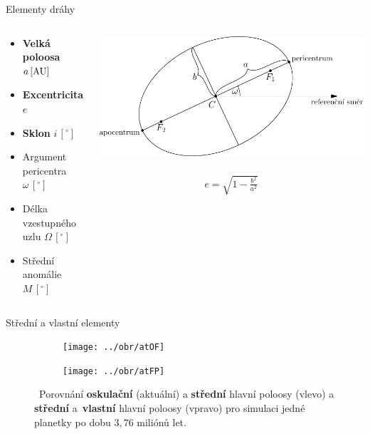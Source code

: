 \documentclass[xcolor=dvipsnames]{beamer}
\begin{document}
\begin{frame}[t]{\secname}{Elementy dráhy}
	\begin{columns}
		\begin{column}{0.5\textwidth}
		\begin{itemize}
			\item \textbf{Velká poloosa} $a\,[{\rm AU}]$  
			\item \textbf{Excentricita} $e$
			\item \textbf{Sklon} $i\,[ ^\circ]$
			\item Argument pericentra $\omega\,[ ^\circ]$
			\item Délka vzestupného uzlu $\Omega\,[ ^\circ]$
			\item Střední anomálie $M \,[ ^\circ]$
		\end{itemize}
		\end{column}
		\begin{column}{0.5\textwidth}
			\includegraphics[width=1.1\textwidth]{../asy/asteroidy-1.pdf}
			\
			\begin{align*}
				e=\sqrt{1-\frac{b^2}{a^2}}
			\end{align*}
		\end{column}
	\end{columns}
\end{frame}

\begin{frame}[t]{\secname}{Střední a vlastní elementy}
	\begin{figure}
		\centering
		\begin{subfigure}[b]{0.49\textwidth}
		\centering
		\texttt{[image: ../obr/atOF]}
		\end{subfigure}
		\begin{subfigure}[b]{0.49\textwidth}
		\centering
		\texttt{[image: ../obr/atFP]}
		\end{subfigure}
		\caption{\ Porovnání \textbf{oskulační} (aktuální) a \textbf{střední} hlavní poloosy (vlevo) a \textbf{střední} a~\textbf{vlastní} hlavní poloosy (vpravo) pro simulaci jedné planetky po dobu $3,76$ miliónů let.}
	\end{figure}
\end{frame}
\end{document}
